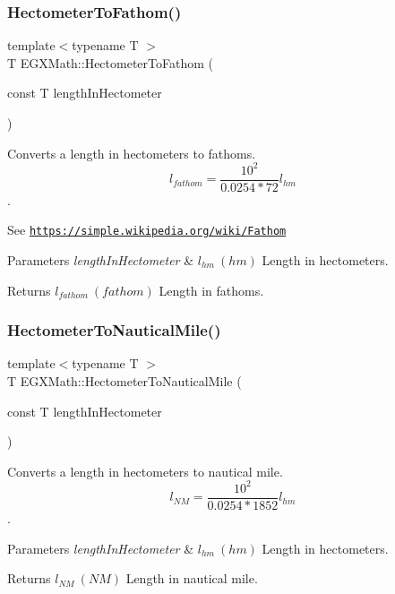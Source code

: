 \subsubsection{\texorpdfstring{Hectometer\+To\+Fathom()}{HectometerToFathom()}}
{\footnotesize\ttfamily template$<$typename T $>$ \\
T E\+G\+X\+Math\+::\+Hectometer\+To\+Fathom (\begin{DoxyParamCaption}\item[{const T}]{length\+In\+Hectometer }\end{DoxyParamCaption})}



Converts a length in hectometers to fathoms. \[ l_{fathom}= \frac{10^{2}}{0.0254 * 72} l_{hm} \]. 

See \href{https://simple.wikipedia.org/wiki/Fathom}{\tt https\+://simple.\+wikipedia.\+org/wiki/\+Fathom} 
\begin{DoxyParams}{Parameters}
{\em length\+In\+Hectometer} & $ l_{hm}\ (hm)$ Length in hectometers. \\
\hline
\end{DoxyParams}
\begin{DoxyReturn}{Returns}
$ l_{fathom}\ (fathom)$ Length in fathoms. 
\end{DoxyReturn}
\mbox{\label{group___e_g_x_math-_conversions-_length_conversions-_hectometer-_nautical_ga74e84be72b4e2272d547b5d7e21211dc}} 
\subsubsection{\texorpdfstring{Hectometer\+To\+Nautical\+Mile()}{HectometerToNauticalMile()}}
{\footnotesize\ttfamily template$<$typename T $>$ \\
T E\+G\+X\+Math\+::\+Hectometer\+To\+Nautical\+Mile (\begin{DoxyParamCaption}\item[{const T}]{length\+In\+Hectometer }\end{DoxyParamCaption})}



Converts a length in hectometers to nautical mile. \[ l_{NM}= \frac{10^{2}}{0.0254 * 1852} l_{hm} \]. 


\begin{DoxyParams}{Parameters}
{\em length\+In\+Hectometer} & $ l_{hm}\ (hm)$ Length in hectometers. \\
\hline
\end{DoxyParams}
\begin{DoxyReturn}{Returns}
$ l_{NM}\ (NM)$ Length in nautical mile. 
\end{DoxyReturn}
